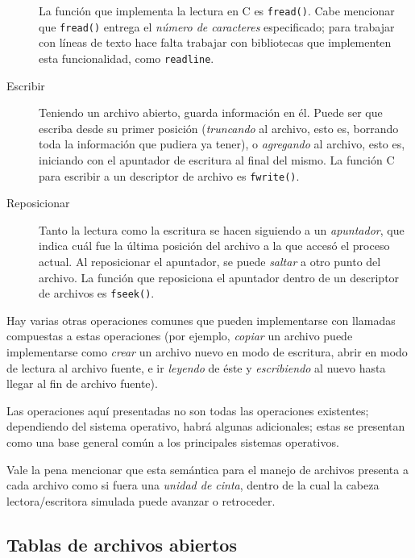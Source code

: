 \documentclass[11pt,fleqn]{book} %
\begin{document}
\begin{description}
	  La función que implementa la lectura en C es \texttt{fread()}. Cabe
          mencionar que \texttt{fread()} entrega el \emph{número de caracteres}
          especificado; para trabajar con líneas de texto hace falta
          trabajar con bibliotecas que implementen esta funcionalidad,
          como \texttt{readline}.
\item[Escribir] Teniendo un archivo abierto, guarda información en
              él. Puede ser que escriba desde su primer posición
              (\emph{truncando} al archivo, esto es, borrando toda la
              información que pudiera ya tener), o \emph{agregando} al
              archivo, esto es, iniciando con el apuntador de
              escritura al final del mismo. La función C para escribir a
              un descriptor de archivo es \texttt{fwrite()}.
\item[Reposicionar] Tanto la lectura como la escritura se hacen
                  siguiendo a un \emph{apuntador}, que indica cuál fue la
                  última posición del archivo a la que accesó el
                  proceso actual. Al reposicionar el apuntador,
                  se puede \emph{saltar} a otro punto del archivo. La
                  función que reposiciona el apuntador dentro de un
                  descriptor de archivos es \texttt{fseek()}.
\end{description}

Hay varias otras operaciones comunes que pueden implementarse con
llamadas compuestas a estas operaciones (por ejemplo, \emph{copiar} un
archivo puede implementarse como \emph{crear} un archivo nuevo en modo de
escritura, abrir en modo de lectura al archivo fuente, e ir \emph{leyendo} de éste
y \emph{escribiendo} al nuevo hasta llegar al fin de archivo fuente).

Las operaciones aquí presentadas no son todas las operaciones
existentes; dependiendo del sistema operativo, habrá algunas
adicionales; estas se presentan como una base general común a los
principales sistemas operativos.

Vale la pena mencionar que esta semántica para el manejo de archivos
presenta a cada archivo como si fuera una \emph{unidad de cinta}, dentro de
la cual la cabeza lectora/escritora simulada puede avanzar o
retroceder.
\subsection{Tablas de archivos abiertos}
\label{sec-6-2-2}
\label{DIR_tablas_de_archivos}
\end{document}
